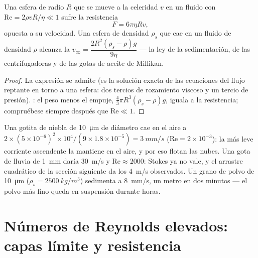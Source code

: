 \begin{proposition}\label{prop:b2:viscous-flows:stokes}
Una esfera de radio $R$ que se mueve a la celeridad $v$ en un fluido con
$\mathrm{Re} = 2\rho vR/\eta \ll 1$ sufre la resistencia
\[
F = 6\pi\eta Rv ,
\]
opuesta a su velocidad. Una esfera de densidad $\rho_s$ que cae en un fluido
de densidad $\rho$ alcanza la \emph{} $v_\infty =
\dfrac{2R^2(\rho_s - \rho)g}{9\eta}$ --- la ley de la sedimentación, de las
centrifugadoras y de las gotas de aceite de Millikan.
\end{proposition}

\begin{proof}
La expresión se admite (es la solución exacta de las ecuaciones del flujo
reptante en torno a una esfera: dos tercios de rozamiento viscoso y un
tercio de presión). : el peso menos el empuje, $\tfrac43\pi R^3(\rho_s -
\rho)g$, iguala a la resistencia; compruébese siempre después que $\mathrm{Re} \ll 1$.
\end{proof}

\begin{example}\label{ex:b2:viscous-flows:fog}
Una gotita de niebla de \qty{10}{\micro m} de diámetro cae en el aire a $2 \times (5 \times
10^{-6})^2 \times 10^4/(9 \times 1.8 \times 10^{-5}) = \qty{3}{mm/s}$ ($\mathrm{Re} = 2 \times
10^{-3}$): la más leve corriente ascendente la mantiene en el aire, y por
eso flotan las nubes. Una gota de lluvia de \qty{1}{mm} daría \qty{30}{m/s} y $\mathrm{Re} \approx 2000$:
Stokes ya no vale, y el arrastre cuadrático de la sección siguiente da los
\qty{4}{m/s} observados. Un grano de polvo de \qty{10}{\micro m} ($\rho_s =
\qty{2500}{kg/m^3}$) sedimenta a \qty{8}{mm/s}, un metro en dos minutos ---
el polvo más fino queda en suspensión durante horas.
\end{example}

\section{Números de Reynolds elevados: capas límite y resistencia}

